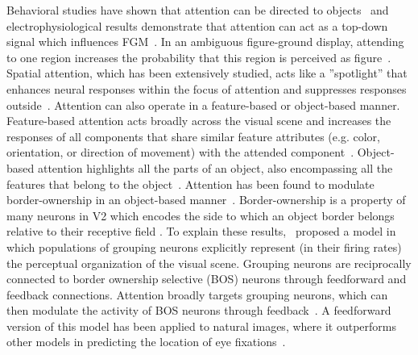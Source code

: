 Behavioral studies have shown that attention can be directed to objects~\citep{Egly_etal94} and electrophysiological results demonstrate that attention can act as a top-down signal which influences FGM~\citep{Qiu_etal07, Poort_etal12}. In an ambiguous figure-ground display, attending to one region increases the probability that this region is perceived as figure~\citep{Driver_Baylis96, Vecera_etal04}. Spatial attention, which has been extensively studied, acts like a ''spotlight'' that enhances neural responses within the focus of attention and suppresses responses outside~\citep{Motter93a}. Attention can also operate in a feature-based or object-based manner. Feature-based attention acts broadly across the visual scene and increases the responses of all components that share similar feature attributes (e.g. color, orientation, or direction of movement) with the attended component~\citep{Treue_Trujillo99}. Object-based attention highlights all the parts of an object, also encompassing all the features that belong to the object~\citep{Roelfsema_etal98, Schoenfeld_etal14}. Attention has been found to modulate border-ownership in an object-based manner~\citep{Qiu_etal07}. Border-ownership is a property of many neurons in V2 which encodes the side to which an object border
belongs relative to their receptive field \citep{Zhou_etal00}. To explain these results,~\citet{Craft_etal07} proposed a model in which populations of grouping neurons explicitly represent (in their firing rates) the perceptual organization of the visual scene. Grouping neurons are reciprocally connected to border ownership selective (BOS) neurons through feedforward and feedback connections. Attention broadly targets grouping neurons, which can then modulate the activity of BOS neurons through feedback~\citep{Mihalas_etal11b}. A feedforward version of this model has been applied to natural images, where it outperforms other models in predicting the location of eye fixations~\citep{Russell_etal14}.

